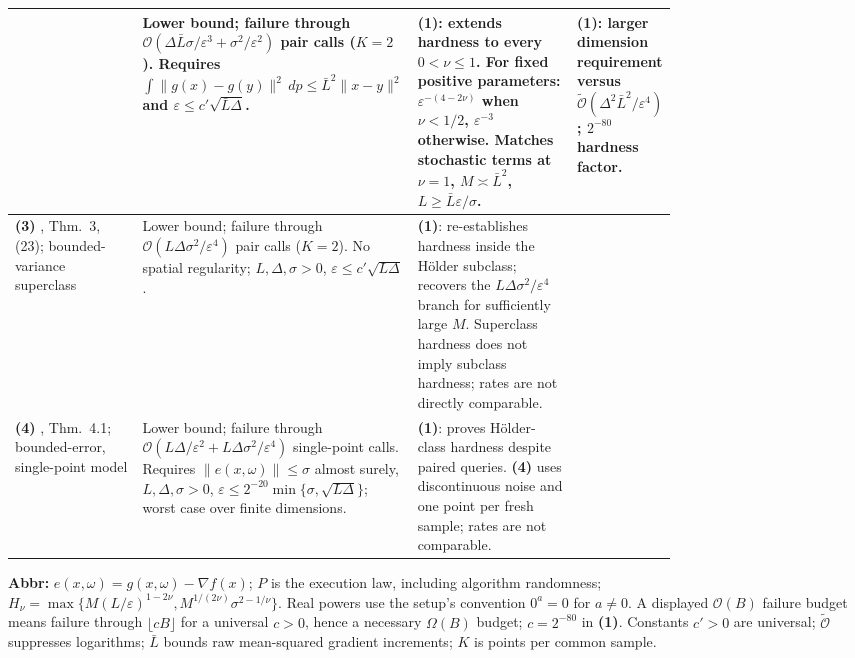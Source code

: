 \begin{table}[tp]
\begin{threeparttable}
\begin{tabularx}{\linewidth}{@{}>{\raggedright\arraybackslash}p{0.20\linewidth}>{\raggedright\arraybackslash}p{0.32\linewidth}>{\raggedright\arraybackslash}p{0.25\linewidth}>{\raggedright\arraybackslash}X@{}}
& Lower bound; failure through $\mathcal{O}(\Delta\bar L\sigma/\varepsilon^3+\sigma^2/\varepsilon^2)$ pair calls ($K=2$). Requires $\int\|g(x)-g(y)\|^2\,dp\le\bar L^2\|x-y\|^2$ and $\varepsilon\le c'\sqrt{\bar L\Delta}$.
& \textbf{(1)}: extends hardness to every $0<\nu\le1$. For fixed positive parameters: $\varepsilon^{-(4-2\nu)}$ when $\nu<1/2$, $\varepsilon^{-3}$ otherwise. Matches stochastic terms at $\nu=1$, $M\asymp\bar L^2$, $L\ge\bar L\varepsilon/\sigma$.
& \textbf{(1)}: larger dimension requirement versus $\widetilde{\mathcal{O}}(\Delta^2\bar L^2/\varepsilon^4)$; $2^{-80}$ hardness factor. \\
\midrule
\textbf{(3)} \citep{hnnlArjevani2023V2}, Thm.~3, (23); bounded-variance superclass
& Lower bound; failure through $\mathcal{O}(L\Delta\sigma^2/\varepsilon^4)$ pair calls ($K=2$). No spatial regularity; $L,\Delta,\sigma>0$, $\varepsilon\le c'\sqrt{L\Delta}$.
& \textbf{(1)}: re-establishes hardness inside the H\"older subclass; recovers the $L\Delta\sigma^2/\varepsilon^4$ branch for sufficiently large $M$. Superclass hardness does not imply subclass hardness; rates are not directly comparable.
& \\
\midrule
\textbf{(4)} \citep{hnnlJin2026V1}, Thm.~4.1; bounded-error, single-point model
& Lower bound; failure through $\mathcal{O}(L\Delta/\varepsilon^2+L\Delta\sigma^2/\varepsilon^4)$ single-point calls. Requires $\|e(x,\omega)\|\le\sigma$ almost surely, $L,\Delta,\sigma>0$, $\varepsilon\le2^{-20}\min\{\sigma,\sqrt{L\Delta}\}$; worst case over finite dimensions.
& \textbf{(1)}: proves H\"older-class hardness despite paired queries. \textbf{(4)} uses discontinuous noise and one point per fresh sample; rates are not comparable.
& \\
\bottomrule
\end{tabularx}
\begin{tablenotes}[flushleft]\footnotesize
\item[] \textbf{Abbr:} $e(x,\omega)=g(x,\omega)-\nabla f(x)$; $P$ is the execution law, including algorithm randomness; $H_\nu=\max\{M(L/\varepsilon)^{1-2\nu},M^{1/(2\nu)}\sigma^{2-1/\nu}\}$. Real powers use the setup's convention $0^a=0$ for $a\ne0$. A displayed $\mathcal{O}(B)$ failure budget means failure through $\lfloor cB\rfloor$ for a universal $c>0$, hence a necessary $\Omega(B)$ budget; $c=2^{-80}$ in \textbf{(1)}. Constants $c'>0$ are universal; $\widetilde{\mathcal{O}}$ suppresses logarithms; $\bar L$ bounds raw mean-squared gradient increments; $K$ is points per common sample.
\end{tablenotes}
\end{threeparttable}
\end{table}
\clearpage
